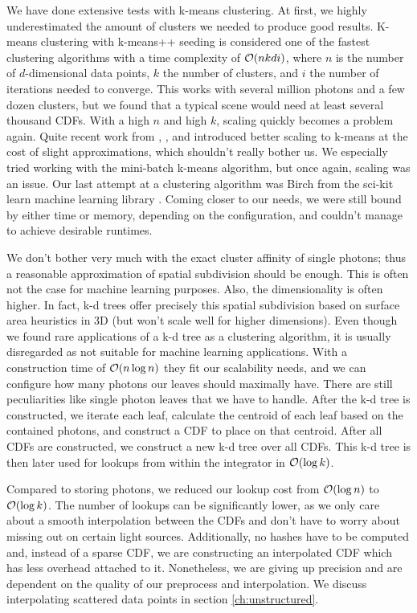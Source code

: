 We have done extensive tests with k-means clustering. At first, we highly underestimated the amount of clusters we needed to produce good results. K-means clustering with k-means++ seeding \parencite{DBLP:conf/soda/ArthurV07} is considered one of the fastest clustering algorithms with a time complexity of $\mathcal{O}(nkdi)$, where $n$ is the number of $d$-dimensional data points, $k$ the number of clusters, and $i$ the number of iterations needed to converge. This works with several million photons and a few dozen clusters, but we found that a typical scene would need at least several thousand CDFs. With a high $n$ and high $k$, scaling quickly becomes a problem again. Quite recent work from \textcite{DBLP:conf/kse/HieuM14}, \textcite{DBLP:journals/tpds/XuQLMLL14}, and \textcite{DBLP:conf/www/Sculley10} introduced better scaling to k-means at the cost of slight approximations, which shouldn't really bother us. We especially tried working with the mini-batch k-means algorithm, but once again, scaling was an issue. Our last attempt at a clustering algorithm was Birch \parencite{DBLP:conf/sigmod/ZhangRL96} from the sci-kit learn machine learning library \parencite{scikit-learn}. Coming closer to our needs, we were still bound by either time or memory, depending on the configuration, and couldn't manage to achieve desirable runtimes.

We don't bother very much with the exact cluster affinity of single photons; thus a reasonable approximation of spatial subdivision should be enough. This is often not the case for machine learning purposes. Also, the dimensionality is often higher. In fact, k-d trees offer precisely this spatial subdivision based on surface area heuristics in 3D (but won't scale well for higher dimensions). Even though we found rare applications of a k-d tree as a clustering algorithm, it is usually disregarded as not suitable for machine learning applications. With a construction time of $\mathcal{O}(n \log n)$ they fit our scalability needs, and we can configure how many photons our leaves should maximally have. There are still peculiarities like single photon leaves that we have to handle. After the k-d tree is constructed, we iterate each leaf, calculate the centroid of each leaf based on the contained photons, and construct a CDF to place on that centroid. After all CDFs are constructed, we construct a new k-d tree over all CDFs. This k-d tree is then later used for lookups from within the integrator in $\mathcal{O}(\log k)$.

Compared to storing photons, we reduced our lookup cost from $\mathcal{O}(\log n)$ to $\mathcal{O}(\log k)$. The number of lookups can be significantly lower, as we only care about a smooth interpolation between the CDFs and don't have to worry about missing out on certain light sources. Additionally, no hashes have to be computed and, instead of a sparse CDF, we are constructing an interpolated CDF which has less overhead attached to it. Nonetheless, we are giving up precision and are dependent on the quality of our preprocess and interpolation. We discuss interpolating scattered data points in section \ref{ch:unstructured}.

